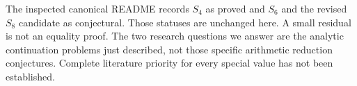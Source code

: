 The inspected canonical README records $S_4$ as proved and $S_6$ and the
revised $S_8$ candidate as conjectural. Those statuses are unchanged here.
A small residual is not an equality proof. The two research questions we
answer are the analytic continuation problems just described, not those
specific arithmetic reduction conjectures. Complete literature priority
for every special value has not been established.
